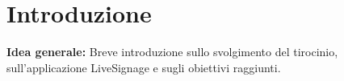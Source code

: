 \chapter{Introduzione}

\textbf{Idea generale:} Breve introduzione sullo svolgimento del tirocinio, sull'applicazione LiveSignage e sugli obiettivi raggiunti.